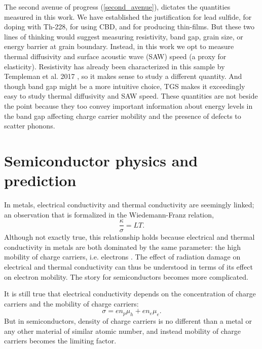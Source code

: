The second avenue of progress (\ref{second_avenue}), dictates the quantities measured in this work. We have established the justification for lead sulfide, for doping with Th-228, for using CBD, and for producing thin-films. But these two lines of thinking would suggest measuring resistivity, band gap, grain size, or energy barrier at grain boundary. Instead, in this work we opt to measure thermal diffusivity and surface acoustic wave (SAW) speed (a proxy for elasticity). Resistivity has already been characterized in this sample by Templeman et al. 2017 \cite{Templeman2017}, so it makes sense to study a different quantity. And though band gap might be a more intuitive choice, TGS makes it exceedingly easy to study thermal diffusivity and SAW speed. These quantities are not beside the point because they too convey important information about energy levels in the band gap affecting charge carrier mobility and the presence of defects to scatter phonons.



\section{Semiconductor physics and prediction}
In metals, electrical conductivity and thermal conductivity are seemingly linked; an observation that is formalized in the Wiedemann-Franz relation,
\begin{equation}
\frac{\kappa}{\sigma} = LT.
\end{equation}
Although not exactly true, this relationship holds because electrical and thermal conductivity in metals are both dominated by the same parameter: the high mobility of charge carriers, i.e. electrons \cite{Lavasani2018}. The effect of radiation damage on electrical and thermal conductivity can thus be understood in terms of its effect on electron mobility. The story for semiconductors becomes more complicated.

It is still true that electrical conductivity depends on the concentration of charge carriers and the mobility of charge carriers:
\begin{equation}
\sigma = en_p\mu_h + en_e\mu_e.
\end{equation}
But in semiconductors, density of charge carriers is no different than a metal or any other material of similar atomic number, and instead mobility of charge carriers becomes the limiting factor.

